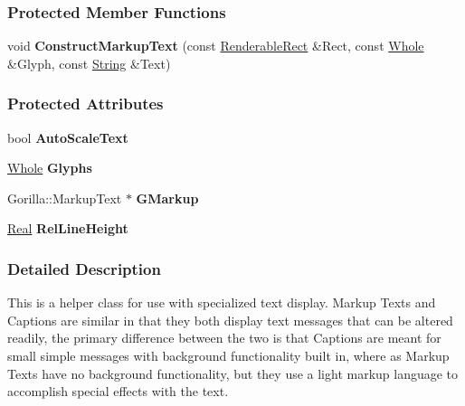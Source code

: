\subsubsection*{Protected Member Functions}
\begin{DoxyCompactItemize}
\item 
\hypertarget{classMezzanine_1_1UI_1_1MarkupText_a9121dbfc87e5ecb083e7bee70a857673}{
void {\bfseries ConstructMarkupText} (const \hyperlink{structMezzanine_1_1UI_1_1RenderableRect}{RenderableRect} \&Rect, const \hyperlink{namespaceMezzanine_adcbb6ce6d1eb4379d109e51171e2e493}{Whole} \&Glyph, const \hyperlink{namespaceMezzanine_acf9fcc130e6ebf08e3d8491aebcf1c86}{String} \&Text)}
\label{classMezzanine_1_1UI_1_1MarkupText_a9121dbfc87e5ecb083e7bee70a857673}

\end{DoxyCompactItemize}
\subsubsection*{Protected Attributes}
\begin{DoxyCompactItemize}
\item 
\hypertarget{classMezzanine_1_1UI_1_1MarkupText_a679bf30c594e408d7366062cdbc963e0}{
bool {\bfseries AutoScaleText}}
\label{classMezzanine_1_1UI_1_1MarkupText_a679bf30c594e408d7366062cdbc963e0}

\item 
\hypertarget{classMezzanine_1_1UI_1_1MarkupText_ae33829acaa93aefe31015edb9e826eef}{
\hyperlink{namespaceMezzanine_adcbb6ce6d1eb4379d109e51171e2e493}{Whole} {\bfseries Glyphs}}
\label{classMezzanine_1_1UI_1_1MarkupText_ae33829acaa93aefe31015edb9e826eef}

\item 
\hypertarget{classMezzanine_1_1UI_1_1MarkupText_abdd8b4a6e55e1987fcb87b9085b29bfa}{
Gorilla::MarkupText $\ast$ {\bfseries GMarkup}}
\label{classMezzanine_1_1UI_1_1MarkupText_abdd8b4a6e55e1987fcb87b9085b29bfa}

\item 
\hypertarget{classMezzanine_1_1UI_1_1MarkupText_a2348b2d5bbad82bdc4aaf31839687272}{
\hyperlink{namespaceMezzanine_a726731b1a7df72bf3583e4a97282c6f6}{Real} {\bfseries RelLineHeight}}
\label{classMezzanine_1_1UI_1_1MarkupText_a2348b2d5bbad82bdc4aaf31839687272}

\end{DoxyCompactItemize}


\subsubsection{Detailed Description}
This is a helper class for use with specialized text display. Markup Texts and Captions are similar in that they both display text messages that can be altered readily, the primary difference between the two is that Captions are meant for small simple messages with background functionality built in, where as Markup Texts have no background functionality, but they use a light markup language to accomplish special effects with the text. 

